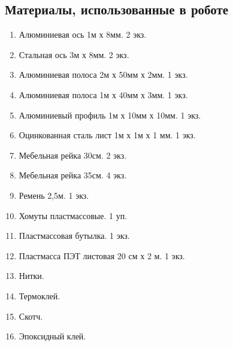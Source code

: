 
\subsection{Материалы, использованные в роботе}

\begin{enumerate}
	\item Алюминиевая ось 1м х 8мм. 2 экз.
	\item Стальная ось 3м х 8мм. 2 экз.
	\item Алюминиевая полоса 2м х 50мм х 2мм. 1 экз.
	\item Алюминиевая полоса 1м х 40мм х 3мм. 1 экз.
	\item Алюминиевый профиль 1м х 10мм х 10мм. 1 экз.
	\item Оцинкованная сталь лист 1м х 1м х 1 мм. 1 экз.
	\item Мебельная рейка 30см. 2 экз.
	\item Мебельная рейка 35см. 4 экз.
	\item Ремень 2,5м. 1 экз.
	\item Хомуты пластмассовые. 1 уп.
	\item Пластмассовая бутылка. 1 экз.
	\item Пластмасса ПЭТ листовая 20 см х 2 м. 1 экз.
	\item Нитки.
	\item Термоклей.
	\item Скотч.
	\item Эпоксидный клей.
\end{enumerate}
\fillpage
\newpage


